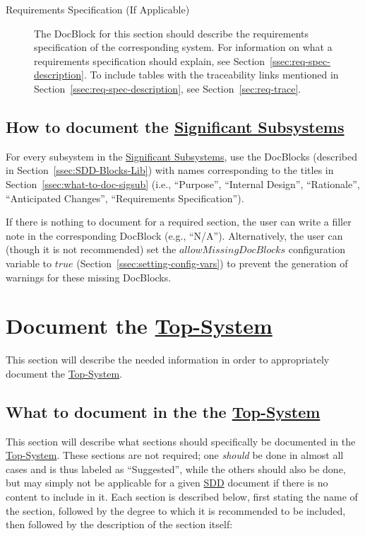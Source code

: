 \documentclass{mcscert}
\newcommand{\topsystemnolink}{Top-System} %
\newcommand{\topsystem}{\hyperref[def:topsystem]{\topsystemnolink{}}}
\newcommand{\sigsubsnolink}{Significant Subsystems} %
\newcommand{\sigsubs}{\hyperref[def:sigsubs]{\sigsubsnolink{}}}
\begin{document}
\begin{description}
  	  \item[Requirements Specification\label{itm:req-spec} (If Applicable)] The \textsf{DocBlock} for this section should describe the requirements specification of the corresponding system. 
  	  For information on what a requirements specification should explain, see Section~\ref{ssec:req-spec-description}. 
  	  To include tables with the traceability links mentioned in Section~\ref{ssec:req-spec-description}, see Section~\ref{sec:req-trace}. 	  
	\end{description}

	\subsection{How to document the \sigsubs{}}
	For every subsystem in the \sigsubs{}, use the \textsf{DocBlocks} (described in	Section~\ref{ssec:SDD-Blocks-Lib}) with names corresponding to the titles in Section~\ref{ssec:what-to-doc-sigsub} (i.e., ``Purpose'', ``Internal Design'', ``Rationale'', ``Anticipated Changes'', ``Requirements Specification'').
	
	If there is nothing to document for a required section, the user can write	a filler note in the corresponding \textsf{DocBlock} (e.g., ``N/A''). 
	Alternatively, the user can (though it is not recommended) set the $allowMissingDocBlocks$ configuration variable to $true$ (Section~\ref{ssec:setting-config-vars}) to prevent the generation of warnings for these missing \textsf{DocBlocks}.

\section{Document the \topsystem{}}
\label{sec:top-level-docblocks}
This section will describe the needed information in order to appropriately document the \topsystem{}.

	\subsection{What to document in the the \topsystem{}} 
	\label{ssec:what-to-doc-topsys}
 	This section will describe what sections should specifically be documented in the \topsystem{}. 
 	These sections are not required; one \emph{should} be done in almost all cases  and is thus labeled as ``Suggested'', while the others should also be done, but may simply not be applicable for a given \hyperref[acr:sdd]{SDD} document if there is no content to include in it. 
 	Each section is described below, first stating the name of the section, followed by the degree to which it is recommended to be included, then followed by the description of the section itself:
\end{document}
